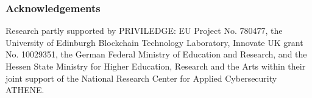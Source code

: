 \subsubsection*{Acknowledgements}
  Research partly supported by PRIVILEDGE: EU Project No. 780477, the
  University of Edinburgh Blockchain Technology Laboratory, Innovate UK grant
  No. 10029351, the German Federal Ministry of
Education and Research, and the Hessen State Ministry for Higher Education,
Research and the Arts within their joint support of the National Research
Center for Applied Cybersecurity ATHENE.
